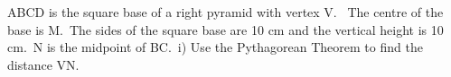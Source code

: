 \documentclass[preview]{standalone}
\begin{document}
\begin{center}
\begin{minipage}{12cm}
\raggedright ABCD is the square base of a right pyramid with vertex V. \
 The centre of the base is M.\
 The sides of the square base are 10 cm and the vertical height is 10 cm.\
 N is the midpoint of BC.\
 i) Use the Pythagorean Theorem to find the distance VN.
\end{minipage}
\end{center}
\end{document}
